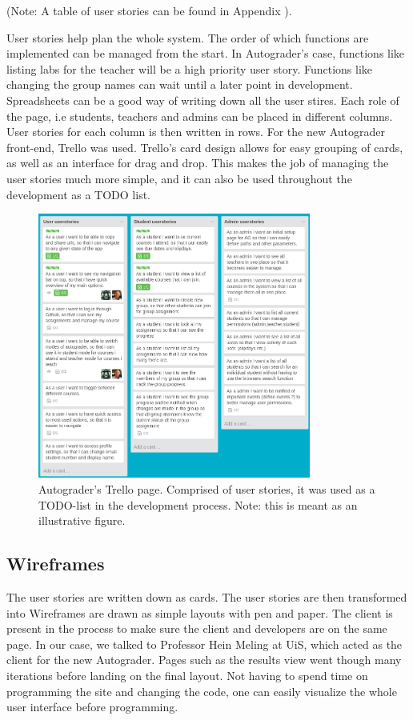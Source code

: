 (Note: A table of user stories can be found in Appendix ).

User stories help plan the whole system. The order of which functions are implemented can be managed from the start. In Autograder's case, functions like listing labs for the teacher will be a high priority user story. Functions like changing the group names can wait until a later point in development. Spreadsheets can be a good way of writing down all the user stires. Each role of the page, i.e students, teachers and admins can be placed in different columns. User stories for each column is then written in rows. For the new Autograder front-end, Trello was used. Trello's card design allows for easy grouping of cards, as well as an interface for drag and drop. This makes the job of managing the user stories much more simple, and it can also be used throughout the development as a TODO list.

\begin{figure}[h!]
    \centering
    \includegraphics[width=0.8\textwidth]{./graphics/trello.png}
    \caption{Autograder's Trello page. Comprised of user stories, it was used as a TODO-list in the development process. Note: this is meant as an illustrative figure.}
    \label{fig:View of the trello page we used in the development process}
\end{figure}

\subsection{Wireframes}
The user stories are written down as cards. The user stories are then transformed into Wireframes are drawn as simple layouts with pen and paper. The client is present in the process to make sure the client and developers are on the same page. In our case, we talked to Professor Hein Meling at UiS, which acted as the client for the new Autograder. Pages such as the results view  went though many iterations before landing on the final layout. Not having to spend time on programming the site and changing the code, one can easily visualize the whole user interface before programming.

